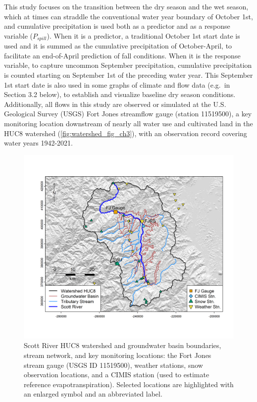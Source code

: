 \documentclass[hess, manuscript]{copernicus}
\begin{document}
This study focuses on the transition between the dry season and the wet
season, which at times can straddle the conventional water year boundary
of October 1st, and cumulative precipitation is used both as a predictor
and as a response variable (\(P_{spill}\)). When it is a predictor, a
traditional October 1st start date is used and it is summed as the
cumulative precipitation of October-April, to facilitate an end-of-April
prediction of fall conditions. When it is the response variable, to
capture uncommon September precipitation, cumulative precipitation is
counted starting on September 1st of the preceding water year. This
September 1st start date is also used in some graphs of climate and flow
data (e.g.~in Section 3.2 below), to establish and visualize baseline
dry season conditions. Additionally, all flows in this study are
observed or simulated at the U.S. Geological Survey (USGS) Fort Jones
streamflow gauge (station 11519500), a key monitoring location
downstream of nearly all water use and cultivated land in the HUC8
watershed (\autoref{fig:watershed_fig_ch3}), with an observation record
covering water years 1942-2021.

\begin{figure}
\includegraphics[width=1\linewidth]{f01} \caption{\label{fig:watershed_fig_ch3} Scott River HUC8 watershed and groundwater basin boundaries, stream network, and key monitoring locations: the Fort Jones stream gauge (USGS ID 11519500), weather stations, snow observation locations, and a CIMIS station (used to estimate reference evapotranspiration). Selected locations are highlighted with an enlarged symbol and an abbreviated label.}\label{fig:watershed_fig_ch3}
\end{figure}
\end{document}

